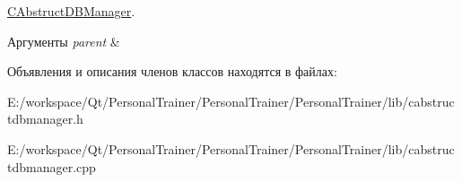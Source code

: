 \hyperlink{class_c_abstruct_d_b_manager}{C\+Abstruct\+D\+B\+Manager}. 


\begin{DoxyParams}{Аргументы}
{\em parent} & \\
\hline
\end{DoxyParams}


Объявления и описания членов классов находятся в файлах\+:\begin{DoxyCompactItemize}
\item 
E\+:/workspace/\+Qt/\+Personal\+Trainer/\+Personal\+Trainer/\+Personal\+Trainer/lib/cabstructdbmanager.\+h\item 
E\+:/workspace/\+Qt/\+Personal\+Trainer/\+Personal\+Trainer/\+Personal\+Trainer/lib/cabstructdbmanager.\+cpp\end{DoxyCompactItemize}
